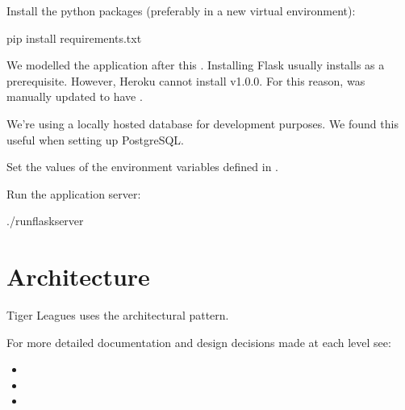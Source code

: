 \documentclass[letterpaper,10pt,english]{sphinxmanual}
\begin{document}
Install the python packages (preferably in a new virtual environment):

\begin{sphinxVerbatim}[commandchars=\\\{\}]
\PYGZdl{} pip install requirements.txt
\end{sphinxVerbatim}

We modelled the application after this .
Installing Flask usually installs  as a prerequisite.
However, Heroku cannot install v1.0.0. For this reason, 
was manually updated to have .

We’re using a locally hosted database for development purposes.
We found this 
useful when setting up PostgreSQL.

Set the values of the environment variables defined in .

Run the application server:

\begin{sphinxVerbatim}[commandchars=\\\{\}]
\PYGZdl{} ./run\PYGZus{}flask\PYGZus{}server
\end{sphinxVerbatim}


\section{Architecture}
\label{\detokenize{readme:architecture}}\label{\detokenize{readme:id3}}
Tiger Leagues uses the 
architectural pattern.

\noindent{}

For more detailed documentation and design decisions made at each level see:
\begin{itemize}
\item {} 

\item {} 

\item {} 

\end{itemize}
\end{document}

